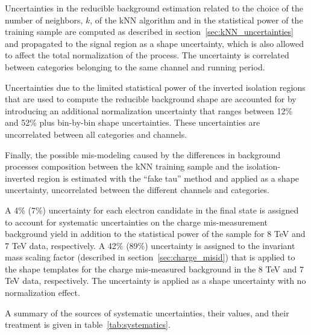 Uncertainties in the reducible background estimation related to the choice of the number of neighbors, $k$, of the kNN algorithm and in the statistical power of the training sample are computed as described in section~\ref{sec:kNN_uncertainties} and propagated to the signal region as a shape uncertainty, which is also allowed to affect the total normalization of the process. The uncertainty is correlated between categories belonging to the same channel and running period.

Uncertainties due to the limited statistical power of the inverted isolation regions that are used to compute the reducible background shape are accounted for by introducing an additional normalization uncertainty that ranges between 12\% and 52\% plus bin-by-bin shape uncertainties. These uncertainties are uncorrelated between all categories and channels.

Finally, the possible mis-modeling caused by the differences in background processes composition between the kNN training sample and the isolation-inverted region is estimated with the ``fake tau'' method and applied as a shape uncertainty, uncorrelated between the different channels and categories.

A 4\% (7\%) uncertainty for each electron candidate in the final state is assigned to account for systematic uncertainties on the charge mis-measurement background yield in addition to the statistical power of the sample for 8 TeV and 7 TeV data, respectively. A 42\% (89\%) uncertainty is assigned to the invariant mass scaling factor (described in section~\ref{sec:charge_misid}) that is applied to the shape templates for the charge mis-measured background in the 8 TeV and 7 TeV data, respectively. The uncertainty is applied as a shape uncertainty with no normalization effect. %

A summary of the sources of systematic uncertainties, their values, and their treatment is given in table~\ref{tab:systematics}.

